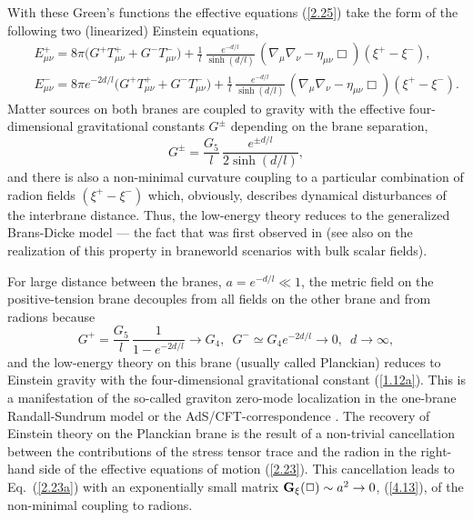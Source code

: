 \documentclass[a4paper,preprint,nofootinbib,
                 showpacs,preprintnumbers,amsmath,amssymb]{revtex4}
\begin{document}
With these Green's functions the effective equations (\ref{2.25}) 
take the form of the following two (linearized) Einstein equations, 
    \begin{eqnarray} 
    &&E_{\mu\nu}^+=8\pi\Big(G^+T_{\mu\nu}^+ 
    +G^-T_{\mu\nu}^-\Big)+\frac1l\, 
    \frac{e^{-d/l}}{\sinh(d/l)}\, 
    (\nabla_\mu\nabla_\nu- 
    \eta_{\mu\nu}\Box)(\xi^+-\xi^-),              \label{4.14a}\\ 
    &&E_{\mu\nu}^-=8\pi e^{-2d/l}\Big(G^+T_{\mu\nu}^+ 
    +G^-T_{\mu\nu}^-\Big)+\frac1l\, 
    \frac{e^{-d/l}}{\sinh(d/l)}\, 
    (\nabla_\mu\nabla_\nu- 
    \eta_{\mu\nu}\Box)(\xi^+-\xi^-).            \label{4.14b} 
    \end{eqnarray} 
Matter sources on both branes are coupled to gravity with the 
effective four-dimensional gravitational constants $G^\pm$ 
\cite{GT} depending on the brane separation, 
    \begin{equation} 
    G^\pm=\frac{G_5}l\, 
    \frac{e^{\pm d/l}}{2\sinh(d/l)},            \label{4.15} 
    \end{equation} 
and there is also a non-minimal curvature coupling to a particular 
combination of radion fields $(\xi^+-\xi^-)$ which, obviously, 
describes dynamical disturbances of the interbrane distance. 
Thus, the low-energy theory reduces to the generalized Brans-Dicke 
model --- the fact that was first observed in \cite{GT} (see also 
\cite{MukKof} on the realization of this property in braneworld 
scenarios with bulk scalar fields). 
 
For large distance between the branes, $a=e^{-d/l}\ll 1$, the metric field 
on the positive-tension brane decouples from all fields on the 
other brane and from radions because 
    \begin{equation} 
    G^+=\frac{G_5}l\, 
    \frac1{1-e^{-2d/l}}\to G_4,\,\,\, 
    G^-\simeq G_4e^{-2d/l}\to 0,\,\,\,d\to\infty,  \label{4.16} 
    \end{equation} 
and the low-energy theory on this brane (usually called Planckian)  
reduces to Einstein 
gravity with the four-dimensional gravitational constant 
(\ref{1.12a}). This is a manifestation of the so-called graviton 
zero-mode localization in the one-brane Randall-Sundrum model 
\cite{RSloc} or the AdS/CFT-correspondence \cite{Gubser,HHR1,HHR2}. 
The recovery of Einstein theory on the Planckian brane is 
the result of a non-trivial cancellation between the contributions 
of the stress tensor trace and the radion in the right-hand side 
of the effective equations of motion (\ref{2.23}). This cancellation 
leads to Eq.~(\ref{2.23a}) with an exponentially small matrix 
${\bf G}_\xi(\Box)\sim a^2\to 0$, (\ref{4.13}), of the non-minimal 
coupling to radions. 
 
\end{document}
